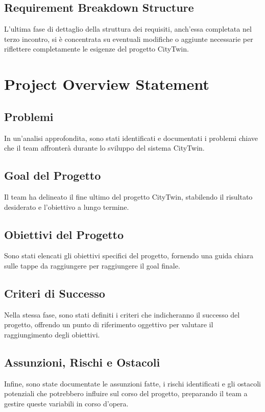 \subsection{Requirement Breakdown Structure}

L'ultima fase di dettaglio della struttura dei requisiti, anch'essa completata nel terzo incontro, si è concentrata su eventuali modifiche o aggiunte necessarie per riflettere completamente le esigenze del progetto CityTwin.

\section{Project Overview Statement}

\subsection{Problemi}

In un'analisi approfondita, sono stati identificati e documentati i problemi chiave che il team affronterà durante lo sviluppo del sistema CityTwin.

\subsection{Goal del Progetto}

Il team ha delineato il fine ultimo del progetto CityTwin, stabilendo il risultato desiderato e l'obiettivo a lungo termine.

\subsection{Obiettivi del Progetto}

Sono stati elencati gli obiettivi specifici del progetto, fornendo una guida chiara sulle tappe da raggiungere per raggiungere il goal finale.

\subsection{Criteri di Successo}

Nella stessa fase, sono stati definiti i criteri che indicheranno il successo del progetto, offrendo un punto di riferimento oggettivo per valutare il raggiungimento degli obiettivi.

\subsection{Assunzioni, Rischi e Ostacoli}

Infine, sono state documentate le assunzioni fatte, i rischi identificati e gli ostacoli potenziali che potrebbero influire sul corso del progetto, preparando il team a gestire queste variabili in corso d'opera.
